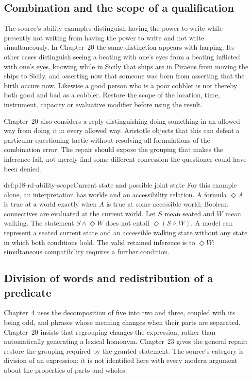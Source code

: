 \subsection{Combination and the scope of a qualification}

The source's ability examples distinguish having the power to write
while presently not writing from having the power to write and not
write simultaneously. In Chapter~20 the same distinction appears with
harping. Its other cases distinguish seeing a beating with one's eyes
from a beating inflicted with one's eyes, knowing while in Sicily that
ships are in Piraeus from moving the ships to Sicily, and asserting
now that someone was born from asserting that the birth occurs now.
Likewise a good person who is a poor cobbler is not thereby both good
and bad as a cobbler. Restore the scope of the location, time,
instrument, capacity or evaluative modifier before using the result.

Chapter~20 also considers a reply distinguishing doing something in
an allowed way from doing it in every allowed way. Aristotle objects
that this can defeat a particular questioning tactic without resolving
all formulations of the combination error. The repair should expose
the grouping that makes the inference fail, not merely find some
different concession the questioner could have been denied.

\begin{hbexample}{def:p18-rd-ability-scope}{Current state and possible joint state}
For this example alone, an interpretation has worlds and an accessibility
relation. A formula \(\Diamond A\) is true at a world exactly when
\(A\) is true at some accessible world; Boolean connectives are
evaluated at the current world. Let \(S\) mean seated and \(W\)
mean walking. The statement \(S\land\Diamond W\) does not entail
\(\Diamond(S\land W)\). A model can represent a seated current
state and an accessible walking state without any state in which both
conditions hold. The valid retained inference is to \(\Diamond W\);
simultaneous compatibility requires a further condition.
\end{hbexample}

\subsection{Division of words and redistribution of a predicate}

Chapter~4 uses the decomposition of five into two and three, coupled
with its being odd, and phrases whose meaning changes when their
parts are separated. Chapter~20 insists that regrouping changes the
expression, rather than automatically generating a lexical homonym.
Chapter~23 gives the general repair: restore the grouping required by
the granted statement. The source's category is division of an
expression; it is not identified here with every modern argument about
the properties of parts and wholes.

